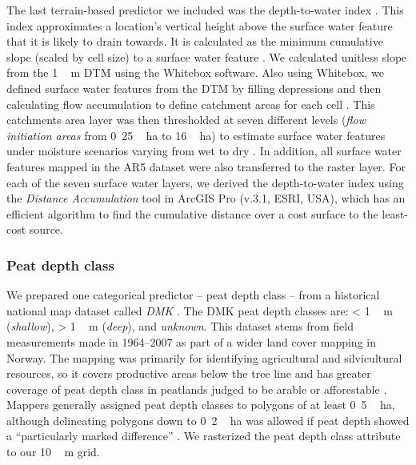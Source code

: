 \documentclass[soil, manuscript]{copernicus}
\begin{document}
The last terrain-based predictor we included was the depth-to-water index \citep{murphyMappingWetlandsComparison2007}.
This index approximates a location's vertical height above the surface water feature that it is likely to drain towards.
It is calculated as the minimum cumulative slope (scaled by cell size) to a surface water feature \citep[eq. 5 in][]{murphyTopographicModellingSoil2009}.
We calculated unitless slope from the \unit{1\,m} DTM using the Whitebox software.
Also using Whitebox, we defined surface water features from the DTM by filling depressions and then calculating flow accumulation to define catchment areas for each cell \citep{schonauerSpatiotemporalPredictionSoil2021, schonauerRcodeCalculatingDepthwater2021}.
This catchments area layer was then thresholded at seven different levels (\emph{flow initiation areas} from \unit{0.25\,ha} to \unit{16\,ha}) to estimate surface water features under moisture scenarios varying from wet to dry \citep{murphyModellingMappingTopographic2011, agrenEvaluatingDigitalTerrain2014, schonauerSpatiotemporalPredictionSoil2021}.
In addition, all surface water features mapped in the AR5 dataset were also transferred to the raster layer.
For each of the seven surface water layers, we derived the depth-to-water index using the \emph{Distance Accumulation} tool in ArcGIS Pro (v.3.1, ESRI, USA), which has an efficient algorithm to find the cumulative distance over a cost surface to the least-cost source.

\subsubsection{Peat depth class}

We prepared one categorical predictor -- peat depth class -- from a historical national map dataset called \emph{DMK} \citep{ahlstromAR5Klassifikasjonssystem2019}.
The DMK peat depth classes are: \textless{} \unit{1\,m} (\emph{shallow}), \textgreater{} \unit{1\,m} (\emph{deep}), and \emph{unknown}.
This dataset stems from field measurements made in 1964--2007 as part of a wider land cover mapping in Norway.
The mapping was primarily for identifying agricultural and silvicultural resources, so it covers productive areas below the tree line and has greater coverage of peat depth class in peatlands judged to be arable or afforestable \citep{bjordalMarkslagsklassifikasjonOkonomiskKartverk2007, ahlstromAR5Klassifikasjonssystem2019}.
Mappers generally assigned peat depth classes to polygons of at least \unit{0.5\,ha}, although delineating polygons down to \unit{0.2\,ha} was allowed if peat depth showed a ``particularly marked difference'' \citep{bjordalMarkslagsklassifikasjonOkonomiskKartverk2007}.
We rasterized the peat depth class attribute to our \unit{10\,m} grid.
\end{document}
